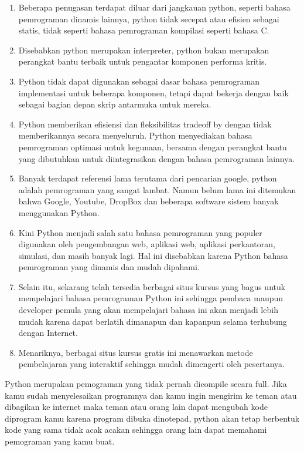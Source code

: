 \begin{enumerate}
\begin{enumerate}
\item Beberapa penugasan terdapat diluar dari jangkauan python, seperti bahasa pemrograman dinamis lainnya, python tidak secepat atau efisien sebagai statis, tidak seperti bahasa pemrograman kompilasi seperti bahasa C.

\item Disebabkan python merupakan interpreter, python bukan merupakan perangkat bantu terbaik untuk pengantar komponen performa kritis.
\item Python tidak dapat digunakan sebagai dasar bahasa pemrograman implementasi untuk beberapa komponen, tetapi dapat bekerja dengan baik sebagai bagian depan skrip antarmuka untuk mereka.
\item Python memberikan efisiensi dan fleksibilitas tradeoff by dengan tidak memberikannya secara menyeluruh. Python menyediakan bahasa pemrograman optimasi untuk kegunaan, bersama dengan perangkat bantu yang dibutuhkan untuk diintegrasikan dengan bahasa pemrograman lainnya.
\item Banyak terdapat referensi lama terutama dari pencarian google, python adalah pemrograman yang sangat lambat. Namun belum lama ini ditemukan bahwa Google, Youtube, DropBox dan beberapa software sistem banyak menggunakan Python.

\item Kini Python menjadi salah satu bahasa pemrograman yang populer digunakan oleh pengembangan web, aplikasi web, aplikasi perkantoran, simulasi, dan masih banyak lagi. Hal ini disebabkan karena Python bahasa pemrograman yang dinamis dan mudah dipahami.
\item Selain itu, sekarang telah tersedia berbagai situs kursus yang bagus untuk mempelajari bahasa pemrograman Python ini sehingga pembaca maupun developer pemula yang akan mempelajari bahasa ini akan menjadi lebih mudah karena dapat berlatih dimanapun dan kapanpun selama terhubung dengan Internet.
\item Menariknya, berbagai situs kursus gratis ini menawarkan metode pembelajaran yang interaktif sehingga mudah dimengerti oleh pesertanya.
\end{enumerate}

Python merupakan pemograman yang tidak pernah dicompile secara full. Jika kamu sudah menyelesaikan programnya dan kamu ingin mengirim ke teman atau dibagikan ke internet maka teman atau orang lain dapat mengubah kode diprogram kamu karena program dibuka dinotepad, python akan tetap berbentuk kode yang sama tidak acak acakan sehingga orang lain dapat memahami pemograman yang kamu buat.


\end{enumerate}
